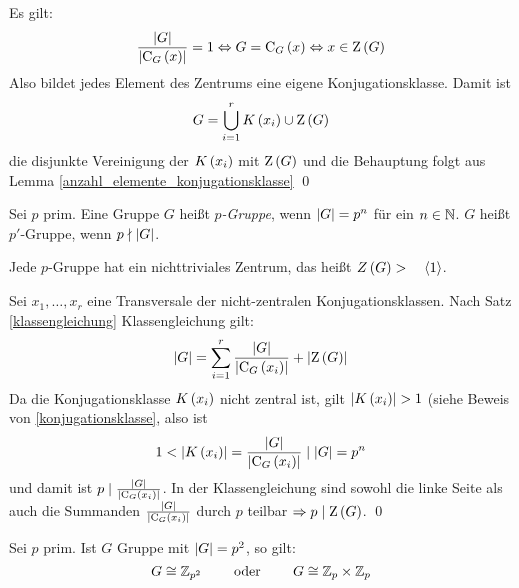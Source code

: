 \begin{beweis}
 Es gilt:
 \begin{equation*}
  \frac{\left|G\right|}{\left|\operatorname{C}_G\left(x\right)\right|}=1 \Leftrightarrow G=\operatorname{C}_G\left(x\right) \Leftrightarrow x \in \operatorname{Z}\left(G\right)
 \end{equation*}
 Also bildet jedes Element des Zentrums eine eigene Konjugationsklasse. Damit ist
 \begin{equation*}
  G=\bigcup_{i=1}^rK\left(x_i\right) \cup \operatorname{Z}\left(G\right)
 \end{equation*}
 die disjunkte Vereinigung der $K\left(x_i\right)$ mit $\operatorname{Z}\left(G\right)$ und die Behauptung folgt aus Lemma \ref{anzahl_elemente_konjugationsklasse}
 \qed
\end{beweis}

\begin{definition}
\label{pgruppe}
 Sei $p$ prim. Eine Gruppe $G$ hei\ss{}t \emph{$p$-Gruppe}, wenn $\left|G\right| = p^n$ f\"ur ein $n\in \mathbb{N}$. $G$ hei\ss{}t $p'$-Gruppe, wenn $p \nmid \left|G\right|$.
\end{definition}

\begin{satz}
\label{pgruppe_hat_nichttriviales_zentrum}
 Jede $p$-Gruppe hat ein nichttriviales Zentrum, das hei\ss{}t $Z\left(G\right) > \quad \left<1\right>$.
\end{satz}

\begin{beweis}
 Sei $x_1,\ldots,x_r$ eine Transversale der nicht-zentralen Konjugationsklassen. Nach Satz \ref{klassengleichung} Klassengleichung gilt:
 \begin{equation*}
  \left|G\right|=\sum_{i=1}^r\frac{\left|G\right|}{\left|\operatorname{C}_G\left(x_i\right)\right|} + \left|\operatorname{Z}\left(G\right)\right|
 \end{equation*}
 Da die Konjugationsklasse $K\left(x_i\right)$ nicht zentral ist, gilt $\left|K\left(x_i\right)\right| > 1$ (siehe Beweis von \ref{konjugationsklasse}, also ist
 \begin{equation*}
  1 < \left|K\left(x_i\right)\right| = \frac{\left|G\right|}{\left| \operatorname{C}_G\left(x_i\right) \right|} \mid \left|G\right| = p^n
 \end{equation*}
 und damit ist $p \mid \frac{\left|G\right|}{\left|\operatorname{C}_G\left(x_i\right)\right|}$. In der Klassengleichung sind sowohl die linke Seite als auch die Summanden $\frac{\left|G\right|}{\left|\operatorname{C}_G\left(x_i\right)\right|}$ durch $p$ teilbar $\Rightarrow p \mid \operatorname{Z}\left(G\right)$.
 \qed
\end{beweis}

\begin{folgerung}
 Sei $p$ prim. Ist $G$ Gruppe mit $\left|G\right|=p^2$, so gilt:
 \begin{equation*}
  G \cong \mathbb{Z}_{p^2} \qquad \mbox{ oder } \qquad G \cong \mathbb{Z}_{p} \times \mathbb{Z}_{p}
 \end{equation*}
\end{folgerung}

